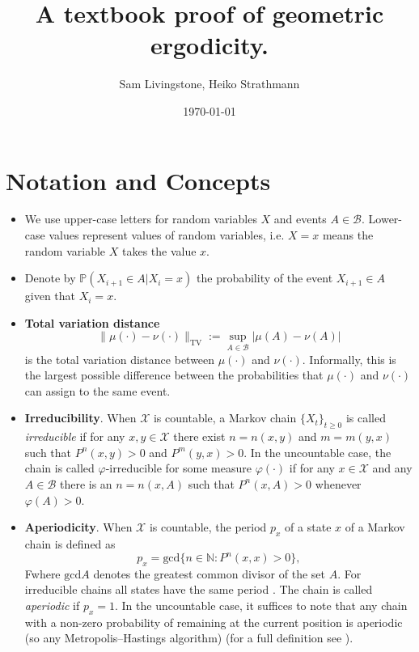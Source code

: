 \documentclass{article}
\title{\Large \bfseries A textbook proof of geometric ergodicity.}
\author{Sam Livingstone, Heiko Strathmann}
\date{\today}
\newcommand{\ch}[1]{ \{#1_t\}_{t \geq 0} }
\newcommand{\X}{\mathcal{X}}
\newcommand{\B}{\mathcal{B}}
\newcommand{\TV}{\text{TV}}
\begin{document}
\maketitle

\listoftodos

\section{Notation and Concepts}

\begin{itemize}
\item We use upper-case letters for random variables $X$ and events $A\in \mathcal{B}$. Lower-case values represent values of random variables, i.e. $X=x$ means the random variable $X$ takes the value $x$.
\item Denote by $\mathbb{P}(X_{i+1} \in A |X_i = x)$ the probability of the event $X_{i+1} \in A$ given that $X_i = x$.
\item \textbf{Total variation distance}
\begin{equation*}
\|\mu(\cdot) - \nu(\cdot)\|_{\TV} := \sup_{A \in \mathcal{B}} |\mu(A) - \nu(A)|
\end{equation*}
is the total variation distance between $\mu(\cdot)$ and $\nu(\cdot)$. Informally, this is the largest possible difference between the probabilities that $\mu(\cdot)$ and $\nu(\cdot)$ can assign to the same event.
\item \textbf{Irreducibility}. When $\X$ is countable, a Markov chain $\ch{X}$ is called \emph{irreducible} if for any $x,y \in \X$ there exist $n = n(x,y)$ and $m = m(y,x)$ such that $P^n(x,y)>0$ and $P^m(y,x) > 0$.  In the uncountable case, the chain is called $\varphi$-irreducible for some measure $\varphi(\cdot)$ if for any $x \in \X$ and any $A \in \B$ there is an $n = n(x,A)$ such that $P^n(x,A) > 0$ whenever $\varphi(A) > 0$.
\item \textbf{Aperiodicity}. When $\X$ is countable, the period $p_x$ of a state $x$ of a Markov chain is defined as
\[
p_x = \text{gcd}\{ n \in \mathbb{N} : P^n(x,x) > 0 \},
\]
Fwhere $\text{gcd}A$ denotes the greatest common divisor of the set $A$.  For irreducible chains all states have the same period \cite{}.  The chain is called \emph{aperiodic} if $p_x = 1$.  In the uncountable case, it suffices to note that any chain with a non-zero probability of remaining at the current position is aperiodic (so any Metropolis--Hastings algorithm) (for a full definition see \cite{}).

\end{itemize}
\end{document}
